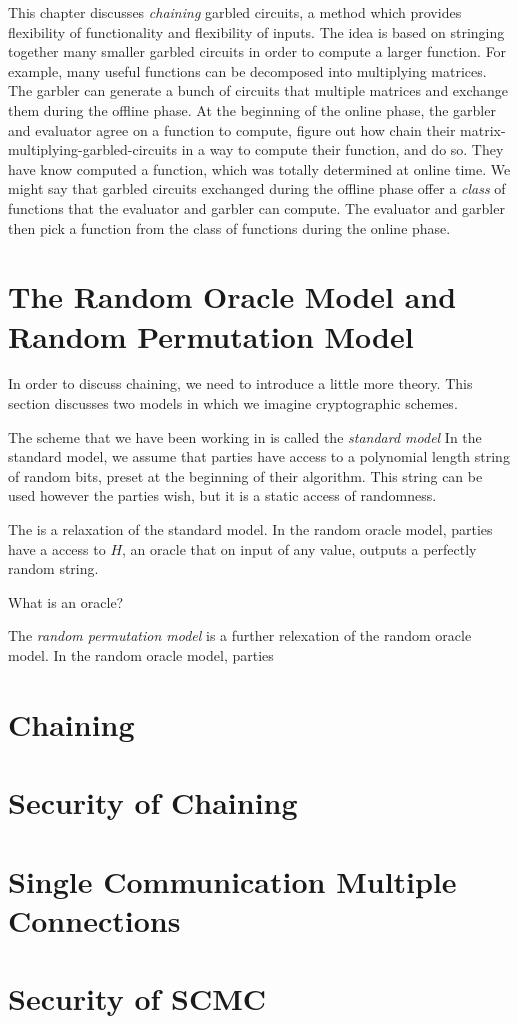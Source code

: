 This chapter discusses \textit{chaining} garbled circuits, a method which provides flexibility of functionality and flexibility of inputs.
The idea is based on stringing together many smaller garbled circuits in order to compute a larger function.
For example, many useful functions can be decomposed into multiplying matrices.
The garbler can generate a bunch of circuits that multiple matrices and exchange them during the offline phase.
At the beginning of the online phase, the garbler and evaluator agree on a function to compute, figure out how chain their matrix-multiplying-garbled-circuits in a way to compute their function, and do so.
They have know computed a function, which was totally determined at online time.
We might say that garbled circuits exchanged during the offline phase offer a \textit{class} of functions that the evaluator and garbler can compute.
The evaluator and garbler then pick a function from the class of functions during the online phase.

\section{The Random Oracle Model and Random Permutation Model}
In order to discuss chaining, we need to introduce a little more theory.
This section discusses two models in which we imagine cryptographic schemes.

The scheme that we have been working in is called the \textit{standard model} 
In the standard model, we assume that parties have access to a polynomial length string of random bits, preset at the beginning of their algorithm.
This string can be used however the parties wish, but it is a static access of randomness.

The  is a relaxation of the standard model.
In the random oracle model, parties have a access to $H$, an oracle that on input of any value, outputs a perfectly random string. 

What is an oracle?

The \textit{random permutation model} is a further relexation of the random oracle model.
In the random oracle model, parties

\section{Chaining}

\section{Security of Chaining}
\section{Single Communication Multiple Connections}
\section{Security of SCMC}
